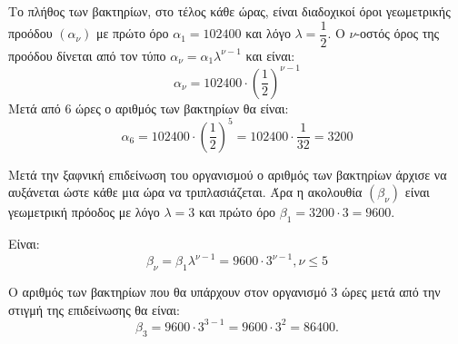 
\begin{alist}
\item Το πλήθος των βακτηρίων, στο τέλος κάθε ώρας, είναι διαδοχικοί όροι γεωμετρικής προόδου $(\alpha_\nu)$ με πρώτο όρο $\alpha_1 = 102400$ και λόγο $\lambda = \dfrac{1}{2}$.
Ο $\nu$-οστός όρος της προόδου δίνεται από τον τύπο $\alpha_\nu = \alpha_1\lambda^{\nu-1}$ και είναι:
\[\alpha_\nu = 102400 \cdot \left(\dfrac{1}{2}\right)^{\nu-1}\]
Μετά από $6$ ώρες ο αριθμός των βακτηρίων θα είναι:
\[\alpha_6 = 102400 \cdot \left(\dfrac{1}{2}\right)^5 = 102400 \cdot \dfrac{1}{32} = 3200\]

\item
\begin{rlist}
\item Μετά την ξαφνική επιδείνωση του οργανισμού ο αριθμός των βακτηρίων άρχισε να αυξάνεται ώστε κάθε μια ώρα να τριπλασιάζεται. Άρα η ακολουθία $(\beta_\nu)$ είναι γεωμετρική πρόοδος με λόγο $\lambda = 3$ και πρώτο όρο $\beta_1 = 3200 \cdot 3 = 9600$.

\item Είναι:
\[\beta_\nu = \beta_1\lambda^{\nu-1} = 9600 \cdot 3^{\nu-1}, \nu \le 5\]

\item Ο αριθμός των βακτηρίων που θα υπάρχουν στον οργανισμό $3$ ώρες μετά από την στιγμή της επιδείνωσης θα είναι:
\[\beta_3 = 9600 \cdot 3^{3-1} = 9600 \cdot 3^2 = 86400.\]
\end{rlist}
\end{alist}


